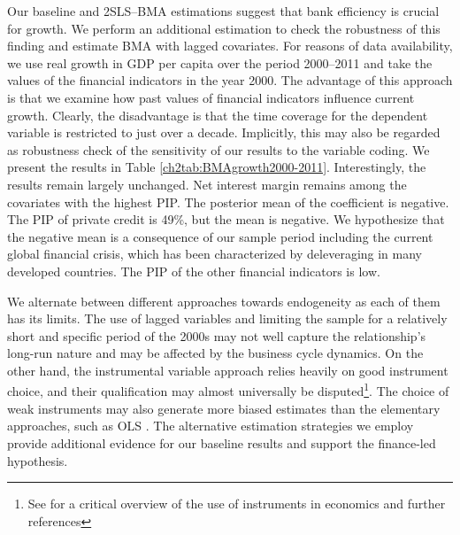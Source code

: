\begin{refsection}
Our baseline and 2SLS--BMA estimations suggest that bank efficiency is crucial for growth. We perform an additional estimation to check the robustness of this finding and estimate \ac{BMA} with lagged covariates. For reasons of data availability, we use real growth in GDP per capita over the period 2000--2011 and take the values of the financial indicators in the year 2000. The advantage of this approach is that we examine how past values of financial indicators influence current growth. Clearly, the disadvantage is that the time coverage for the dependent variable is restricted to just over a decade. Implicitly, this may also be regarded as robustness check of the sensitivity of our results to the variable coding. We present the results in Table \ref{ch2tab:BMAgrowth2000-2011}. Interestingly, the results remain largely unchanged. Net interest margin remains among the covariates with the highest \ac{PIP}. The posterior mean of the coefficient is negative. The \ac{PIP} of private credit is 49\%, but the mean is negative. We hypothesize that the negative mean is a consequence of our sample period including the current global financial crisis, which has been characterized by deleveraging in many developed countries. The \ac{PIP} of the other financial indicators is low.

We alternate between different approaches towards endogeneity as each of them has its limits. The use of lagged variables and limiting the sample for a relatively short and specific period of the 2000s may not well capture the relationship's long-run nature and may be affected by the business cycle dynamics. On the other hand, the instrumental variable approach relies heavily on good instrument choice, and their qualification may almost universally be disputed\footnote{See \textcite{deaton2010instruments} for a critical overview of the use of instruments in economics and further references}. The choice of weak instruments may also generate more biased estimates than the elementary approaches, such as OLS \parencite{bazzi2013blunt}. The alternative estimation strategies we employ provide additional evidence for our baseline results and support the finance-led hypothesis.


\end{refsection}
